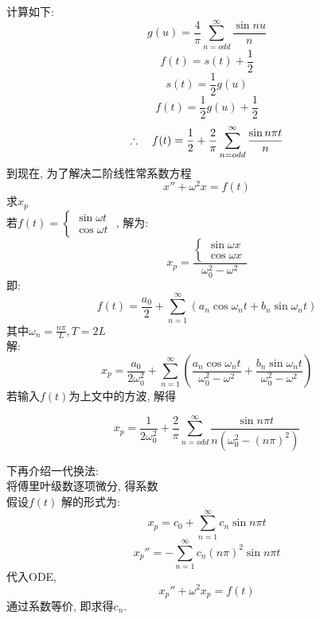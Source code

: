 计算如下:
\[ g(u) = \frac{4}{\pi} \sum_{n = odd}^{\infty}\frac{\sin n u}{n} \]
\[ f(t) = s(t) + \frac{1}{2} \]
\[ s(t) = \frac{1}{2} g(u) \]
\[ f(t) = \frac{1}{2} g(u) + \frac{1}{2} \]
\[ \therefore  \hspace*{1em} f(t) = \frac{1}{2} + \frac{2}{\pi} \sum_{n = odd}^{\infty}\frac{\sin n \pi t}{n} \]
到现在, 为了解决二阶线性常系数方程
\[ x'' + \omega^2 x = f(t) \]
求$x_p$\\
若$f(t) = \left\{
                \begin{aligned}
                \sin \omega t  \\
                \cos \omega t
                \end{aligned}
\right.$ , 解为:
\[x_p =\frac{\left\{
                \begin{aligned}
                 \sin \omega x  \\
                 \cos \omega x
                \end{aligned}
                \right.}{\omega_0^2 - \omega^2} 
\]
即:
\[ f(t) = \frac{a_0}{2} + \sum_{n = 1}^{\infty} (a_n \cos \omega_n t  + b_n \sin \omega_n t )  \]
其中$\omega_n = \frac{n \pi}{L}, T = 2L$\\
解:
\[
x_p = \frac{a_0}{2 \omega_0^2} + \sum_{n = 1}^{\infty} ( \frac{a_n \cos \omega_n t}{\omega_0^2 - \omega^2} + \frac{b_n \sin \omega_n t}{\omega_0^2 - \omega^2})
\]
若输入$f(t)$为上文中的方波, 解得

\[
x_p = \frac{1}{2 \omega_0^2} + \frac{2}{\pi} \sum_{n = odd}^{\infty} \frac{\sin n \pi t}{n (\omega_0^2 - (n \pi)^2)}
\]

下再介绍一代换法: \\
将傅里叶级数逐项微分, 得系数\\
假设$f(t)$ 解的形式为:
\[ x_p = c_0 + \sum_{n = 1}^{\infty} c_n \sin n \pi t  \]
\[ x_p'' = - \sum_{n = 1}^{\infty} c_n (n \pi)^2 \sin n \pi t  \]
代入ODE, 
\[ x_p'' + \omega^2 x_p = f(t) \]
通过系数等价, 即求得$c_n$.
